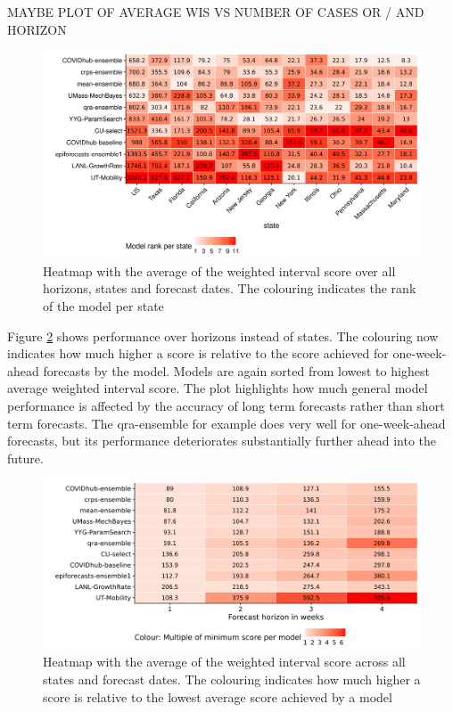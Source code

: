 \documentclass[
]{book}
\begin{document}
MAYBE PLOT OF AVERAGE WIS VS NUMBER OF CASES OR / AND HORIZON

\begin{figure}
\includegraphics[width=1\linewidth]{../visualisation/chapter-5-results/heatmap-model-scores} \caption{Heatmap with the average of the weighted interval score over all horizons, states and forecast dates. The colouring indicates the rank of the model per state}\label{fig:heatmap-performance}
\end{figure}

Figure \ref{fig:heatmap-performance-horizon} shows performance over horizons instead of states. The colouring now indicates how much higher a score is relative to the score achieved for one-week-ahead forecasts by the model. Models are again sorted from lowest to highest average weighted interval score. The plot highlights how much general model performance is affected by the accuracy of long term forecasts rather than short term forecasts. The qra-ensemble for example does very well for one-week-ahead forecasts, but its performance deteriorates substantially further ahead into the future.

\begin{figure}
\includegraphics[width=1\linewidth]{../visualisation/chapter-5-results/heatmap-model-scores-horizon} \caption{Heatmap with the average of the weighted interval score across all states and forecast dates. The colouring indicates how much higher a score is relative to the lowest average score achieved by a model}\label{fig:heatmap-performance-horizon}
\end{figure}
\end{document}
